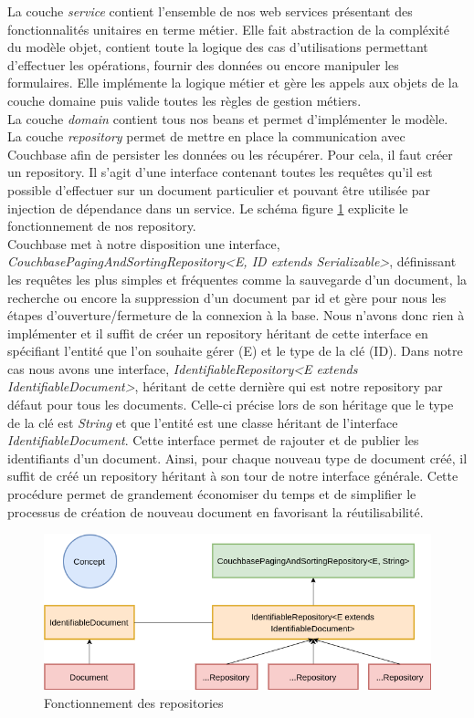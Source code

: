 	La couche \textit{service} contient l'ensemble de nos web services présentant des fonctionnalités unitaires en terme métier. Elle fait abstraction de la compléxité du modèle objet, contient toute la logique des cas d'utilisations permettant d'effectuer les opérations, fournir des données ou encore manipuler les formulaires. Elle implémente la logique métier et gère les appels aux objets de la couche domaine puis valide toutes les règles de gestion métiers. \\
	
	La couche \textit{domain} contient tous nos beans et permet d'implémenter le modèle. \\
	
	La couche \textit{repository} permet de mettre en place la communication avec Couchbase afin de persister les données ou les récupérer. Pour cela, il faut créer un repository. Il s'agit d'une interface contenant toutes les requêtes qu'il est possible d'effectuer sur un document particulier et pouvant être utilisée par injection de dépendance dans un service. Le schéma figure \ref{repository} explicite le fonctionnement de nos repository. \\
	
	Couchbase met à notre disposition une interface, \textit{CouchbasePagingAndSortingRepository<E, ID extends Serializable>}, définissant les requêtes les plus simples et fréquentes comme la sauvegarde d'un document, la recherche ou encore la suppression d'un document par id et gère pour nous les étapes d'ouverture/fermeture de la connexion à la base. Nous n'avons donc rien à implémenter et il suffit de créer un repository héritant de cette interface en spécifiant l'entité que l'on souhaite gérer (E) et le type de la clé (ID). Dans notre cas nous avons une interface, \textit{IdentifiableRepository<E extends IdentifiableDocument>}, héritant de cette dernière qui est notre repository par défaut pour tous les documents. Celle-ci précise lors de son héritage que le type de la clé est \textit{String } et que l'entité est une classe héritant de l'interface \textit{IdentifiableDocument}. Cette interface permet de rajouter et de publier les identifiants d'un document. Ainsi, pour chaque nouveau type de document créé, il suffit de créé un repository héritant à son tour de notre interface générale. Cette procédure permet de grandement économiser du temps et de simplifier le processus de création de nouveau document en favorisant la réutilisabilité.

\begin{figure}[h!]
	\includegraphics[scale=0.55]{images/travailBP1818/piecesJustif/repository.png}
	\centering
	\caption{Fonctionnement des repositories}
	\label{repository}
\end{figure}

